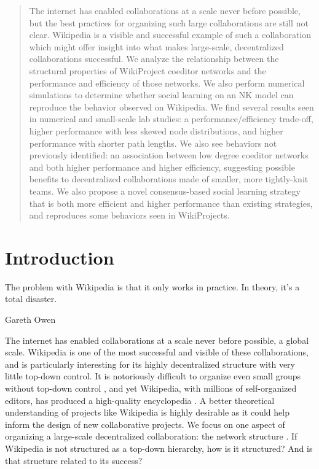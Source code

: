 \begin{abstract}
The internet has enabled collaborations at a scale never before possible,
but the best practices for organizing such large collaborations are still not clear.
Wikipedia is a visible and successful example of such a collaboration which might offer
insight into what makes large-scale, decentralized collaborations successful.
We analyze the relationship between the structural properties of WikiProject coeditor networks
and the performance and efficiency of those networks.
We also perform numerical simulations to determine whether social learning on an NK model can
reproduce the behavior observed on Wikipedia.
We find several results seen in numerical and small-scale lab studies:
a performance/efficiency trade-off,
higher performance with less skewed node distributions,
and higher performance with shorter path lengths.
We also see behaviors not previously identified: an association between low degree coeditor networks
and both higher performance and higher efficiency,
suggesting possible benefits to decentralized collaborations made of smaller, more tightly-knit teams.
We also propose a novel consensus-based social learning strategy that is both more efficient and higher
performance than existing strategies, and reproduces some behaviors seen in WikiProjects.
\end{abstract}

\maketitle

\section{Introduction}
\epigraph
{The problem with Wikipedia is that it only works in practice. In theory, it's a total disaster.}
{Gareth Owen \cite{elsharbaty_editing_2016} }

The internet has enabled collaborations at a scale never before possible, a global scale.
Wikipedia is one of the most successful and visible of these collaborations,
and is particularly interesting for its highly decentralized structure with very little top-down control.
It is notoriously difficult to organize even small groups without top-down control
\cite{freeman_tyranny_1972},
and yet Wikipedia, with millions of self-organized editors,
has produced a high-quality encyclopedia \cite{giles_internet_2005,keegan_evolution_2017}.
A better theoretical understanding of projects like Wikipedia is highly desirable as it could
help inform the design of new collaborative projects.
We focus on one aspect of organizing a large-scale decentralized collaboration:
the network structure \cite{newman_structure_2003}.
If Wikipedia is not structured as a top-down hierarchy, how is it structured?
And is that structure related to its success?

